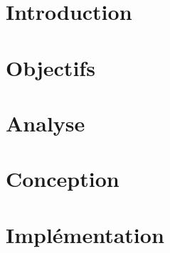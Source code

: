 \documentclass[a4paper,oneside,11pt]{book}
\begin{document}
\dominitoc %
{   
    \pagestyle{empty}

    
    \cleardoublepage

    
    \cleardoublepage
    
    
    \cleardoublepage

    \tableofcontents
    \cleardoublepage
}

\setcounter{page}{1} %
\chapter{Introduction}\label{chap:intro}
\myminitoc

 
\chapter{Objectifs}\label{chap:objectifs}
\myminitoc


\chapter{Analyse}\label{chap:anal}
\myminitoc



\chapter{Conception}\label{chap:conception}
\myminitoc


 
 
\chapter{Implémentation}\label{chap:impl}
\myminitoc

\end{document}
